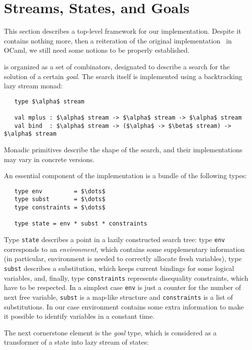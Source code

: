 \section{Streams, States, and Goals}
\label{sec:goals}

This section describes a top-level framework for our implementation. Despite it contains
nothing more, then a reiteration of the original implementation~\cite{MicroKanren, CKanren}
in OCaml, we still need some notions to be properly established.

\miniKanren is organized as a set of combinators, designated to describe a search for
the solution of a certain \emph{goal}. The search itself is implemented using a
backtracking lazy stream monad:

\begin{lstlisting}
   type $\alpha$ stream

   val mplus : $\alpha$ stream -> $\alpha$ stream -> $\alpha$ stream
   val bind  : $\alpha$ stream -> ($\alpha$ -> $\beta$ stream) -> $\alpha$ stream
\end{lstlisting}

Monadic primitives describe the shape of the search, and their implementations may
vary in concrete \miniKanren versions.

An essential component of the implementation is a bundle of the following types:

\begin{lstlisting}
   type env         = $\dots$
   type subst       = $\dots$
   type constraints = $\dots$

   type state = env * subst * constraints
\end{lstlisting}

Type \lstinline{state} describes a point in a lazily constructed search tree: type \lstinline{env} corresponds
to an \emph{environment}, which contains some supplementary information (in particular, environment is needed to
correctly allocate fresh variables), type \lstinline{subst} describes a substitution, which keeps current bindings
for some logical variables, and, finally, type \lstinline{constraints} represents disequality constraints,
which have to be respected. In a simplest case \lstinline{env} is just a counter for the number of next free
variable, \lstinline{subst} is a map-like structure and \lstinline{constraints} is a list of substitutions. In our
case environment contains some extra information to make it possible to identify variables in a constant time.

The next cornerstone element is the \emph{goal} type, which is considered as a transformer of a state into
lazy stream of states:

